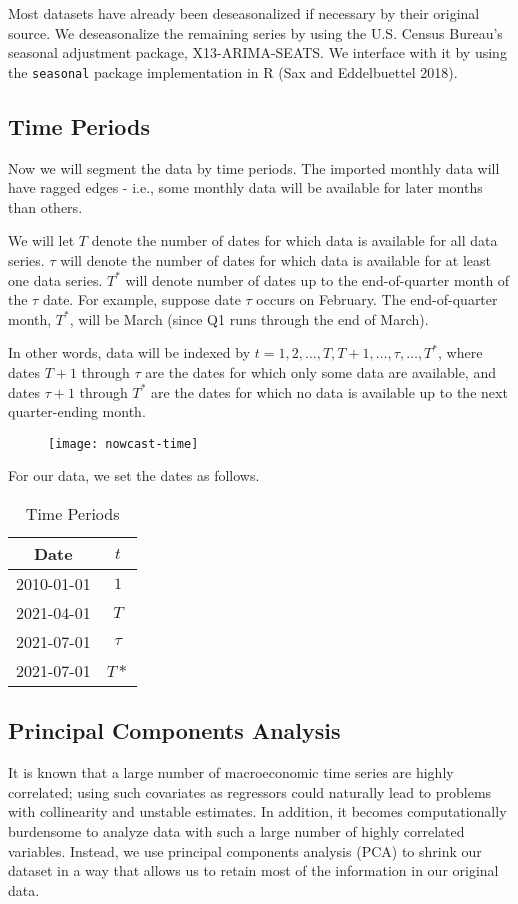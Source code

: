 \documentclass[11pt, letterpaper]{article}\usepackage[]{graphicx}\usepackage[]{color}
\begin{document}
Most datasets have already been deseasonalized if necessary by their original source. We deseasonalize the remaining series by using the U.S. Census Bureau's seasonal adjustment package, X13-ARIMA-SEATS. We interface with it by using the \texttt{seasonal} package implementation in R (Sax and Eddelbuettel 2018).

\subsection{Time Periods}
Now we will segment the data by time periods. The imported monthly data will have ragged edges - i.e., some monthly data will be available for later months than others.

We will let $T$ denote the number of dates for which data is available for all data series. $\tau$ will denote the number of dates for which data is available for at least one data series. $T^*$ will denote number of dates up to the end-of-quarter month of the $\tau$ date. For example, suppose date $\tau$ occurs on February. The end-of-quarter month, $T^*$, will be March (since Q1 runs through the end of March). 

In other words, data will be indexed by $t = 1, 2, \dots, T, T+1, \dots, \tau, \dots, T^*$, where dates $T + 1$ through $\tau$ are the dates for which only some data are available, and dates $\tau + 1$ through $T^*$ are the dates for which no data is available up to the next quarter-ending month.
\begin{figure}[H]
\texttt{[image: nowcast-time]}
\centering
\end{figure}
For our data, we set the dates as follows.
\begin{table}[H]
\centering
\begingroup\footnotesize
\begin{tabular}{cc}
  \hline
Date & $t$ \\ 
  \hline
2010-01-01 & $1$ \\ 
  2021-04-01 & $T$ \\ 
  2021-07-01 & $\tau$ \\ 
  2021-07-01 & $T*$ \\ 
   \hline
\end{tabular}
\endgroup
\caption{Time Periods} 
\end{table}


\subsection{Principal Components Analysis}
It is known that a large number of macroeconomic time series are highly correlated; using such covariates as regressors could naturally lead to problems with collinearity and unstable estimates. In addition, it becomes computationally burdensome to analyze data with such a large number of highly correlated variables. Instead, we use principal components analysis (PCA) to shrink our dataset in a way that allows us to retain most of the information in our original data.
\end{document}
